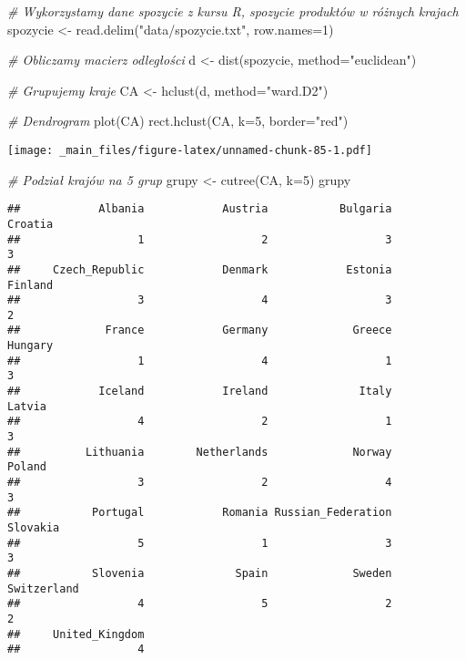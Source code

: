 \documentclass[
]{book}
\newenvironment{Shaded}{\begin{snugshade}}{\end{snugshade}}
\newcommand{\AttributeTok}[1]{\textcolor[rgb]{0.77,0.63,0.00}{#1}}
\newcommand{\CommentTok}[1]{\textcolor[rgb]{0.56,0.35,0.01}{\textit{#1}}}
\newcommand{\DecValTok}[1]{\textcolor[rgb]{0.00,0.00,0.81}{#1}}
\newcommand{\FunctionTok}[1]{\textcolor[rgb]{0.00,0.00,0.00}{#1}}
\newcommand{\NormalTok}[1]{#1}
\newcommand{\OtherTok}[1]{\textcolor[rgb]{0.56,0.35,0.01}{#1}}
\newcommand{\StringTok}[1]{\textcolor[rgb]{0.31,0.60,0.02}{#1}}
\begin{document}
\begin{Shaded}
\begin{Highlighting}[]
\CommentTok{\# Wykorzystamy dane spozycie z kursu R, spozycie produktów w różnych krajach }
\NormalTok{spozycie }\OtherTok{\textless{}{-}} \FunctionTok{read.delim}\NormalTok{(}\StringTok{"data/spozycie.txt"}\NormalTok{, }\AttributeTok{row.names=}\DecValTok{1}\NormalTok{)}

\CommentTok{\# Obliczamy macierz odległości}
\NormalTok{d }\OtherTok{\textless{}{-}} \FunctionTok{dist}\NormalTok{(spozycie, }\AttributeTok{method=}\StringTok{"euclidean"}\NormalTok{)}

\CommentTok{\# Grupujemy kraje}
\NormalTok{CA }\OtherTok{\textless{}{-}} \FunctionTok{hclust}\NormalTok{(d, }\AttributeTok{method=}\StringTok{"ward.D2"}\NormalTok{) }

\CommentTok{\# Dendrogram}
\FunctionTok{plot}\NormalTok{(CA)}
\FunctionTok{rect.hclust}\NormalTok{(CA, }\AttributeTok{k=}\DecValTok{5}\NormalTok{, }\AttributeTok{border=}\StringTok{"red"}\NormalTok{) }
\end{Highlighting}
\end{Shaded}

\texttt{[image: \_main\_files/figure-latex/unnamed-chunk-85-1.pdf]}

\begin{Shaded}
\begin{Highlighting}[]
\CommentTok{\# Podział krajów na 5 grup}
\NormalTok{grupy }\OtherTok{\textless{}{-}} \FunctionTok{cutree}\NormalTok{(CA, }\AttributeTok{k=}\DecValTok{5}\NormalTok{)}
\NormalTok{grupy}
\end{Highlighting}
\end{Shaded}

\begin{verbatim}
##            Albania            Austria           Bulgaria            Croatia 
##                  1                  2                  3                  3 
##     Czech_Republic            Denmark            Estonia            Finland 
##                  3                  4                  3                  2 
##             France            Germany             Greece            Hungary 
##                  1                  4                  1                  3 
##            Iceland            Ireland              Italy             Latvia 
##                  4                  2                  1                  3 
##          Lithuania        Netherlands             Norway             Poland 
##                  3                  2                  4                  3 
##           Portugal            Romania Russian_Federation           Slovakia 
##                  5                  1                  3                  3 
##           Slovenia              Spain             Sweden        Switzerland 
##                  4                  5                  2                  2 
##     United_Kingdom 
##                  4
\end{verbatim}
\end{document}
